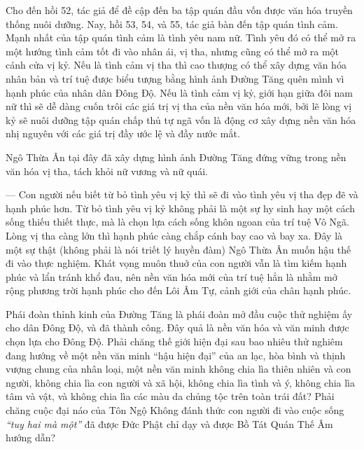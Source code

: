 Cho đến hồi 52, tác giả để đề cập đến ba tập quán đầu vốn được văn hóa truyền thống nuôi dưỡng. Nay, hồi 53, 54, và 55, tác giả bàn đến tập quán tình cảm. Mạnh nhất của tập quán tình cảm là tình yêu nam nữ. Tình yêu đó có thể mở ra một hướng tình cảm tốt đi vào nhân ái, vị tha, nhưng cũng có thể mở ra một cánh cửa vị kỷ. Nếu là tình cảm vị tha thì cao thượng có thể xây dựng văn hóa nhân bản và trí tuệ được biểu tượng bằng hình ảnh Đường Tăng quên mình vì hạnh phúc của nhân dân Đông Độ. Nếu là tình cảm vị kỷ, giới hạn giữa đôi nam nữ thì sẽ dễ dàng cuốn trôi các giá trị vị tha của nền văn hóa mới, bởi lẽ lòng vị kỷ sẽ nuôi dưỡng tập quán chấp thủ tự ngã vốn là động cơ xây dựng nền văn hóa nhị nguyên với các giá trị đầy ước lệ và đầy nước mắt.

Ngô Thừa Ân tại đây đã xây dựng hình ảnh Đường Tăng đứng vững trong nền văn hóa vị tha, tách khỏi nữ vương và nữ quái.

— Con người nếu biết từ bỏ tình yêu vị kỷ thì sẽ đi vào tình yêu vị tha đẹp đẽ và hạnh phúc hơn. Từ bỏ tình yêu vị kỷ không phải là một sự hy sinh hay một cách sống thiếu thiết thực, mà là chọn lựa cách sống khôn ngoan của trí tuệ Vô Ngã. Lòng vị tha càng lớn thì hạnh phúc càng chắp cánh bay cao và bay xa. Đây là một sự thật (không phải là nói triết lý huyền đàm) Ngô Thừa Ân muốn hậu thế đi vào thực nghiệm. Khát vọng muôn thuở của con người vẫn là tìm kiếm hạnh phúc và lẩn tránh khổ đau, nên nền văn hóa mới của trí tuệ hẳn là nhằm mở rộng phương trời hạnh phúc cho đến Lôi Âm Tự, cảnh giới của chân hạnh phúc.

Phái đoàn thỉnh kinh của Đường Tăng là phái đoàn mở đầu cuộc thử nghiệm ấy cho dân Đông Độ, và đã thành công. Đây quả là nền văn hóa và văn minh được chọn lựa cho Đông Độ. Phải chăng thế giới hiện đại sau bao nhiêu thử nghiêm đang hướng về một nền văn minh ``hậu hiện đại'' của an lạc, hòa bình và thịnh vượng chung của nhân loại, một nền văn minh không chia lìa thiên nhiên và con người, không chia lìa con người và xã hội, không chia lìa tình và ý, không chia lìa tâm và vật, và không chia lìa các màu da chủng tộc trên toàn trái đất? Phải chăng cuộc đại náo của Tôn Ngộ Không đánh thức con người đi vào cuộc sống \emph{``tuy hai mà một''} đã được Đức Phật chỉ dạy và được Bồ Tát Quán Thế Âm hướng dẫn?
